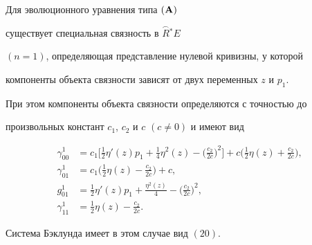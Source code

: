 \begin{lems}


Для эволюционного уравнения типа $(\bold A)$


существует специальная связность в $\overset{\frown}{R}{} ^ * E$


$({n=1})$, определяющая представление нулевой кривизны, у которой 


компоненты объекта связности зависят от двух переменных $z$ и $p_1$. 


При этом компоненты объекта связности определяются с точностью до 


произвольных констант $c_1$, $c_2$ и $c$ $(c\ne 0)$ и имеют вид


\begin{align*}


\gamma_{00}^1&=c_1 \bigg[ \frac{1}{2}\eta' (z) p_1+\frac14\eta^2 (z)-


\bigg(\frac{c_2}{2c}\bigg) ^2 \bigg]+c


\bigg(\frac{1}{2}\eta (z)+\frac{c_2}{2c}\bigg), \\


\gamma_{01}^1&=c_1 \bigg({\frac{1}{2}\eta (z)-\frac{{c_2}}{{2c}}}\bigg)+c, \\


g_{01}^1&=\frac{1}{2}\eta' (z) p_1+\frac{{\eta ^2 (z)}}{4}-


\bigg({\frac{{c_2}}{{2c}}}\bigg)^2, \\


\gamma_{11}^1&=\frac{1}{2}\eta (z)-\frac{{c_2}}{{2c}}.


\end{align*}


Система Бэклунда имеет в этом случае вид $(20)$.


\end{lems}





